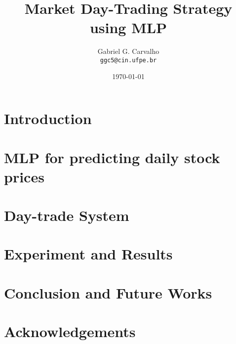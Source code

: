 \documentclass{article}
\title{Market Day-Trading Strategy using MLP}
\author{Gabriel G. Carvalho \\ \texttt{ggc5@cin.ufpe.br}}
\date{\today}
\begin{document}
\maketitle

\begin{abstract}

\end{abstract}
\maketitle

\section{Introduction}

\section{MLP for predicting daily stock prices}

\section{Day-trade System}

\section{Experiment and Results}

\section{Conclusion and Future Works}

\section*{Acknowledgements}

%
%
\end{document}
